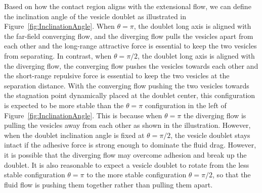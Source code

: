 \documentclass[prf,superscriptaddress,showkeys]{revtex4-1}
\begin{document}
Based on how the contact region aligns with the extensional flow, we can
define the inclination angle of the vesicle doublet as illustrated in
Figure~\ref{fig:InclinationAngle}. When $\theta=\pi$, the doublet long
axis is aligned with the far-field converging flow, and the diverging flow
pulls the vesicles apart from each other and the long-range attractive
force is essential to keep the two vesicles from separating.  In
contrast, when $\theta = \pi/2$, the doublet long axis is aligned with
the diverging flow, the converging flow pushes the vesicles towards
each other and the short-range repulsive force is essential to keep the
two vesicles at the separation distance.  With the converging flow
pushing the two vesicles towards the stagnation point dynamically placed
at the doublet center, this configuration is expected to be more stable
than the $\theta=\pi$ configuration in the left of
Figure~\ref{fig:InclinationAngle}. This is because when $\theta=\pi$ the
diverging flow is pulling the vesicles away from each other as shown in
the illustration.  However, when the doublet inclination angle is fixed
at $\theta=\pi/2$, the vesicle doublet stays intact if the adhesive
force is strong enough to dominate the fluid drag.  However, it is
possible that the diverging flow may overcome adhesion and break up the
doublet.  It is also reasonable to expect a vesicle doublet to rotate
from the less stable configuration $\theta=\pi$ to the more stable
configuration $\theta=\pi/2$, so that the fluid flow is pushing them
together rather than pulling them apart.
\end{document}
